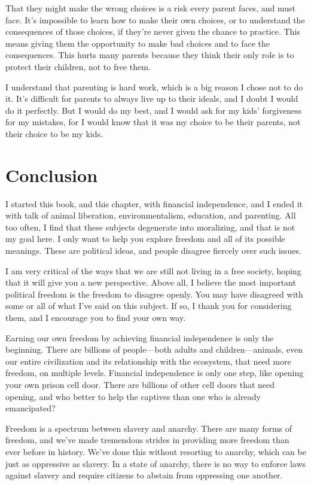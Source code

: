 That they might make the wrong choices is a risk every parent faces, and must face. It's impossible to learn how to make their own choices, or to understand the consequences of those choices, if they're never given the chance to practice. This means giving them the opportunity to make bad choices and to face the consequences. This hurts many parents because they think their only role is to protect their children, not to free them.

I understand that parenting is hard work, which is a big reason I chose not to do it. It's difficult for parents to always live up to their ideals, and I doubt I would do it perfectly. But I would do my best, and I would ask for my kids' forgiveness for my mistakes, for I would know that it was my choice to be their parents, not their choice to be my kids.

\section{Conclusion}
I started this book, and this chapter, with financial independence, and I ended it with talk of animal liberation, environmentalism, education, and parenting. All too often, I find that these subjects degenerate into moralizing, and that is not my goal here. I only want to help you explore freedom and all of its possible meanings. These are political ideas, and people disagree fiercely over such issues.

I am very critical of the ways that we are still not living in a free society, hoping that it will give you a new perspective. Above all, I believe the most important political freedom is the freedom to disagree openly. You may have disagreed with some or all of what I've said on this subject. If so, I thank you for considering them, and I encourage you to find your own way.

Earning our own freedom by achieving financial independence is only the beginning. There are billions of people---both adults and children---animals, even our entire civilization and its relationship with the ecosystem, that need more freedom, on multiple levels. Financial independence is only one step, like opening your own prison cell door. There are billions of other cell doors that need opening, and who better to help the captives than one who is already emancipated?

Freedom is a spectrum between slavery and anarchy. There are many forms of freedom, and we've made tremendous strides in providing more freedom than ever before in history. We've done this without resorting to anarchy, which can be just as oppressive as slavery. In a state of anarchy, there is no way to enforce laws against slavery and require citizens to abstain from oppressing one another.

